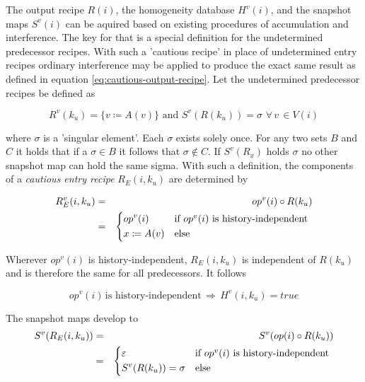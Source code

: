 \documentclass[12pt,a4paper]{scrartcl}
\begin{document}
The output recipe $R(i)$, the homogeneity database $H^v(i)$, and the snapshot
maps $S^v(i)$ can be aquired based on existing procedures of accumulation and
interference. The key for that is a special definition for the undetermined
predecessor recipes. With such a 'cautious recipe' in place of undetermined
entry recipes ordinary interference may be applied to produce the exact same
result as defined in equation \eqref{eq:cautious-output-recipe}.  Let the
undetermined predecessor recipes be defined as

\begin{equation} \label{eq:undetermined-recipe}
    R^v(k_u) = \{ v \coloneqq A(v) \} \,\,\mbox{and}\,\, S^v(R(k_u)) = \sigma\,\,\forall\,v\,\in V(i)
\end{equation}

where $\sigma$ is a 'singular element'. Each $\sigma$ exists solely once. For
any two sets $B$ and $C$ it holds that if a $\sigma \in B$ it follows that
$\sigma \notin C$.  If $S^v(R_x)$ holds $\sigma$ no other snapshot map can hold
the same sigma.  With such a definition, the components of a \textit{cautious
entry recipe} $R_E(i,k_u)$ are determined by

\begin{eqnarray}
    R^v_E(i,k_u) & = & op^v(i) \circ R(k_u) \\
                 & = & \begin{dcases*}
                       op^v(i)         & if $op^v(i)$ is history-independent \\
                       x \coloneq A(v) & else
                       \end{dcases*}
\end{eqnarray}

Wherever $op^v(i)$ is history-independent, $R_E(i,k_u)$ is independent of $R(k_u)$ and is
therefore the same for all predecessors. It follows

\begin{equation} \label{eq:cautious-recipe-homogeneity}
    op^v(i) \,\mbox{is history-independent}\,\Rightarrow\,H^v(i, k_u) = true
\end{equation}

The snapshot maps develop to
\begin{eqnarray} \label{eq:cautious-repl-1}
    S^v(R_E(i,k_u)) & = & S^v(op(i) \circ R(k_u)) \\ 
                    & = & \begin{dcases*}
                          \varepsilon          & if $op^v(i)$ is history-independent \\
                          S^v(R(k_u)) = \sigma & else
                          \end{dcases*}
\end{eqnarray}
\end{document}
